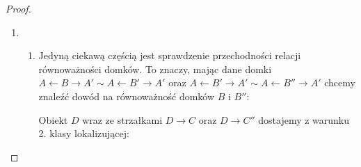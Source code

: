 \begin{proof}
  \begin{enumerate}
    \item 
      \begin{enumerate}
        \item Jedyną ciekawą częścią jest sprawdzenie przechodności relacji równoważności domków. To znaczy, mając dane domki $A\leftarrow B\to A'\sim A\leftarrow B'\to A'$ oraz $A\leftarrow B'\to A'\sim A\leftarrow B''\to A'$ chcemy znaleźć dowód na równoważność domków $B$ i $B''$:
          \begin{center}\end{center}
          Obiekt $D$ wraz ze strzałkami $D\to C$ oraz $D\to C''$ dostajemy z warunku 2. klasy lokalizującej:
          \begin{center}\end{center}
      \end{enumerate}
  \end{enumerate}
\end{proof}
